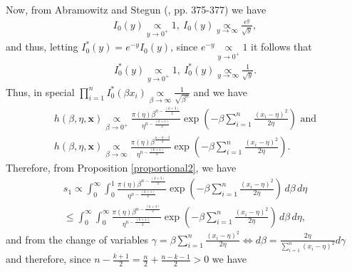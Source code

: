 \documentclass[12pt]{interact}
\theoremstyle{plain}%
\theoremstyle{definition}
\theoremstyle{remark}
\begin{document}
\begin{appendix}
Now, from Abramowitz 
and Stegun (\cite{abramowitz}, pp. 375-377) we have
\begin{equation*}
\begin{aligned}
I_0(y) \underset{y\to 0^+}{\propto} 1,\ I_0(y) \underset{y\to \infty}{\propto} \frac{e^y}{\sqrt{y}},
\end{aligned}
\end{equation*}
and thus, letting $I_0^*\left(y\right) = e^{-y} I_0\left(y\right)$, since $e^{-y} \underset{y\to 0^+}{\propto} 1$ it follows that
\begin{equation}\label{I_0_ineq}
\begin{aligned}
I_0^*(y) \underset{y\to 0^+}{\propto} 1,\ I_0^*(y) \underset{y\to \infty}{\propto} \frac{1}{\sqrt{y}}.
\end{aligned}
\end{equation}
Thus, in special $\prod_{i=1}^{n}I_0^*\left(\beta x_i \right)\underset{\beta\to\infty}{\propto} \frac{1}{\sqrt{\beta^{{n}}}}$ and we have
\begin{equation*}
\begin{aligned}
h(\beta,\eta,\boldsymbol{x}) \underset{\beta\to 0^+} \propto \frac{\pi(\eta)\beta^{n-\frac{(k+3)}{2}}}{\eta^{n-\frac{(k+1)}{2}}} \exp\left( -\beta\sum_{i=1}^{n}\frac{(x_i - \eta)^2}{2\eta} \right)\mbox{ and}
\\ h(\beta,\eta,\boldsymbol{x}) \underset{\beta\to \infty} \propto \frac{\pi(\eta)\beta^{\frac{n-k-3}{2}}}{\eta^{n-\frac{(k+1)}{2}}} \exp\left( -\beta\sum_{i=1}^{n}\frac{(x_i - \eta)^2}{2\eta} \right).
\end{aligned}
\end{equation*}
Therefore, from Proposition \ref{proportional2}, we have
\begin{equation*}
\begin{aligned}
s_1 \propto \int_0^\infty  
 \int_0^1 \frac{\pi(\eta)\beta^{n-\frac{(k+3)}{2}}}{\eta^{n-\frac{(k+1)}{2}}} \exp\left( -\beta\sum_{i=1}^{n}\frac{(x_i - \eta)^2}{2\eta} \right) \, d\beta\, d\eta\\
 \leq \int_0^\infty \int_0^\infty \frac{\pi(\eta)\beta^{n-\frac{(k+3)}{2}}}{\eta^{n-\frac{(k+1)}{2}}} \exp\left( -\beta\sum_{i=1}^{n}\frac{(x_i - \eta)^2}{2\eta} \right) \, d\beta\, d\eta,
\end{aligned}
\end{equation*}
and from the change of variables $\gamma = \beta \sum_{i=1}^{n}\frac{(x_i - \eta)^2}{2\eta}\Leftrightarrow d\beta = \frac{2\eta}{\sum_{i=1}^{n}(x_i - \eta)^2}d\gamma$ and therefore, since $n - \frac{k+1}{2}=\frac{n}{2} + \frac{n-k-1}{2}> 0$ we have

\end{appendix}
\end{document}
